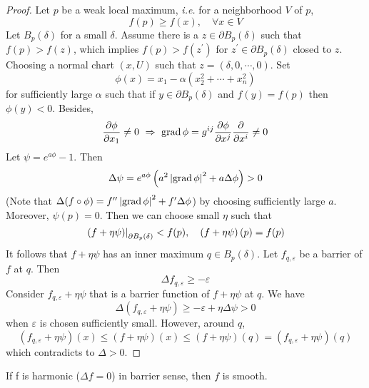 \begin{enumerate}[label=\arabic{*}.]
\begin{proof}
		Let $p$ be a weak local maximum, \emph{i.e.} for a neighborhood $V$ of $p$,
		\begin{equation*}
			f(p) \geq f(x),\quad \forall x \in V
		\end{equation*}
		Let $B_p(\delta)$ for a small $\delta$. Assume there is a $z \in \partial B_p(\delta)$ such that $f(p) > f(z)$, which implies $f(p) > f(z^\prime)$ for $z^\prime \in \partial B_p(\delta)$ closed to $z$. Choosing a normal chart $(x,U)$ such that $z = (\delta,0,\cdots,0)$. Set
		\begin{equation*}
			\phi(x) = x_1 - \alpha(x_2^2+\cdots+x_n^2)
		\end{equation*}
		for sufficiently large $\alpha$ such that if $y \in \partial B_p(\delta)$ and $f(y) = f(p)$ then $\phi(y) < 0$. Besides,
		\begin{equation*}
			\frac{\partial \phi}{\partial x_1} \neq 0~\Rightarrow~ \operatorname{grad }\phi = g^{ij}\frac{\partial \phi}{\partial x^j}\frac{\partial}{\partial x^i} \neq 0
		\end{equation*}
		Let $\psi = e^{a\phi} - 1$. Then
		\begin{equation*}
			\Delta \psi = e^{a\phi}\left(a^2\left\lvert\operatorname{grad}\phi\right\lvert^2 + a\Delta\phi\right) > 0
		\end{equation*}
		(Note that $\Delta (f \circ \phi) = f^{\prime\prime}\left\lvert\operatorname{grad}\phi\right\lvert^2 + f^\prime\Delta\phi$) by choosing sufficiently large $a$. Moreover, $\psi(p) = 0$. Then we can choose small $\eta$ such that
		\begin{equation*}
			\left.\left(f + \eta \psi\right)\right\lvert_{\partial B_p(\delta)} < f(p),\quad \left(f + \eta \psi\right)(p) = f(p)
		\end{equation*}
		It follows that $f + \eta \psi$ has an inner maximum $q \in B_p(\delta)$. Let $f_{q,\varepsilon}$ be a barrier of $f$ at $q$. Then
		\begin{equation*}
			\Delta f_{q,\varepsilon} \geq -\varepsilon
		\end{equation*}
		Consider $f_{q,\varepsilon} + \eta \psi$ that is a barrier function of $f + \eta \psi$ at $q$. We have
		\begin{equation*}
			\Delta(f_{q,\varepsilon} + \eta \psi) \geq -\varepsilon + \eta \Delta \psi > 0
		\end{equation*}
		when $\varepsilon$ is chosen sufficiently small. However, around $q$,
		\begin{equation*}
			(f_{q,\varepsilon} + \eta \psi)(x) \leq (f + \eta \psi)(x) \leq (f + \eta \psi)(q) = (f_{q,\varepsilon} + \eta \psi)(q)
		\end{equation*}
		which contradicts to $\Delta > 0$. \qedhere
	\end{proof}
	\begin{thm}[Regularity]
		If f is harmonic ($\Delta f = 0$) in barrier sense, then $f$ is smooth.
	\end{thm}


\end{enumerate}

